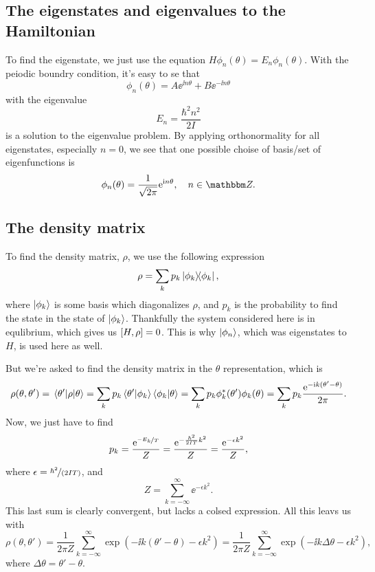 \documentclass[11pt,letter, swedish, english
]{article}
\begin{document}
\subsection{The eigenstates and eigenvalues to the Hamiltonian}
To find the eigenstate, we just use the equation
$H\phi_n(\theta)=E_n\phi_n(\theta)$. With the peiodic boundry
condition, it's easy to se that
\begin{equation}
\phi_n(\theta)= A\ee^{\ii n\theta}+B\ee^{-\ii n\theta}
\end{equation}
with the eigenvalue
\begin{equation}
E_n=\frac{\hbar^2n^2}{2I}
\end{equation}
is a solution to the eigenvalue problem. By applying orthonormality
for all eigenstates, especially $n=0$, we see that one possible choise
of basis/set of eigenfunctions is
\begin{equation}
\phi_n(\theta)=\frac{1}{\sqrt{2\pi}}\ee^{\ii n\theta}\qcomma n\in\Z.
\end{equation}


\subsection{The density matrix}
To find the density matrix, $\rho$, we use the following expression
\begin{equation}
\rho = \sum_k p_k \op{\phi_k},
\end{equation}
where $\ket{\phi_k}$ is some basis which diagonalizes $\rho$, and
$p_k$ is the probability to find the state in the state of
$\ket{\phi_k}$. Thankfully the system considered here is in
equlibrium, which gives us $\comm{H}{\rho}=0$. This is why
$\ket{\phi_n}$, which was eigenstates to $H$, is used here as well. 

But we're asked to find the density matrix in the
$\theta$ representation, which is
\begin{equation}
\rho(\theta, \theta') = \mel{\theta'}{\rho}{\theta}
= \sum_k p_k \ip{\theta'}{\phi_k}\ip{\phi_k}{\theta}
= \sum_k p_k \phi_k^*(\theta')\phi_k(\theta)
= \sum_k p_k \frac{\ee^{-\ii k (\theta'-\theta)}}{2\pi}.
\end{equation}
Now, we just have to find
\begin{equation}
p_k = \frac{\mathrm{e}^{\nicefrac{-E_k}{T}}}{Z} 
=\frac{\mathrm{e}^{-\frac{\hbar^2}{2IT}k^2}}{Z} 
=\frac{\mathrm{e}^{-\epsilon k^2}}{Z}, 
\end{equation}
where $\epsilon=\nicefrac{\hbar^2}{(2IT)}$, and
\begin{equation}
Z=\sum_{k=-\infty}^\infty\ee^{-\epsilon k^2}.
\end{equation}
This last sum is clearly convergent, but lacks a colsed
expression. All this leavs us with
\begin{equation}
\rho(\theta, \theta')
= \frac{1}{2\pi Z} 
\sum_{k=-\infty}^\infty \exp(-\ii k(\theta'-\theta) -\epsilon k^2)
= \frac{1}{2\pi Z} 
\sum_{k=-\infty}^\infty \exp(-\ii k\Delta\theta -\epsilon k^2),
\end{equation}
where $\Delta\theta=\theta'-\theta$.
\end{document}

